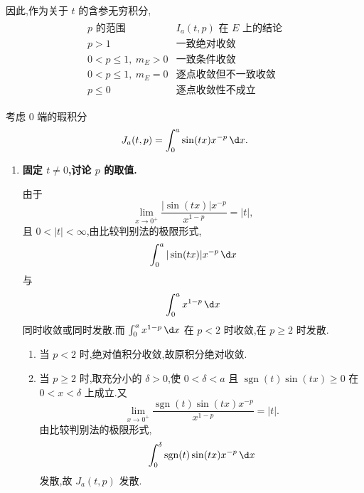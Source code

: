 \begin{example}
\begin{enumerate}
		因此,作为关于 $t$ 的含参无穷积分,
		\begin{gather*}
		\begin{array}{c|c}
			p\text{ 的范围}&I_a(t,p)\text{ 在 }E\text{ 上的结论}\\ \hline
			p>1&\text{一致绝对收敛}\\[3pt]
			0<p\leq1,\ m_E>0&\text{一致条件收敛}\\[3pt]
			0<p\leq1,\ m_E=0&\text{逐点收敛但不一致收敛}\\[3pt]
			p\leq0&\text{逐点收敛性不成立}
		\end{array}
		\end{gather*}
	\end{enumerate}
\end{example}

\begin{example}
	考虑 $0$ 端的瑕积分
	\begin{equation*}
		J_a(t,p)=\int_0^a \sin(tx)x^{-p}\,\d x.
	\end{equation*}

	\begin{enumerate}
		\item \textbf{固定 $t\neq0$,讨论 $p$ 的取值.}

		由于
		\begin{equation*}
			\lim_{x\to0^+}\frac{|\sin(tx)|x^{-p}}{x^{1-p}}=|t|,
		\end{equation*}
		且 $0<|t|<\infty$,由比较判别法的极限形式,
		\begin{equation*}
			\int_0^a |\sin(tx)|x^{-p}\,\d x
		\end{equation*}
		与
		\begin{equation*}
			\int_0^a x^{1-p}\,\d x
		\end{equation*}
		同时收敛或同时发散.而 $\int_0^a x^{1-p}\,\d x$ 在 $p<2$ 时收敛,在 $p\geq2$ 时发散.

		\begin{enumerate}
			\item 当 $p<2$ 时,绝对值积分收敛,故原积分绝对收敛.

			\item 当 $p\geq2$ 时,取充分小的 $\delta>0$,使 $0<\delta<a$ 且 $\operatorname{sgn}(t)\sin(tx)\geq0$ 在 $0<x<\delta$ 上成立.又
			\begin{equation*}
				\lim_{x\to0^+}
				\frac{\operatorname{sgn}(t)\sin(tx)x^{-p}}{x^{1-p}}
				=|t|.
			\end{equation*}
			由比较判别法的极限形式,
			\begin{equation*}
				\int_0^\delta \operatorname{sgn}(t)\sin(tx)x^{-p}\,\d x
			\end{equation*}
			发散,故 $J_a(t,p)$ 发散.
		\end{enumerate}


\end{enumerate}
\end{example}
